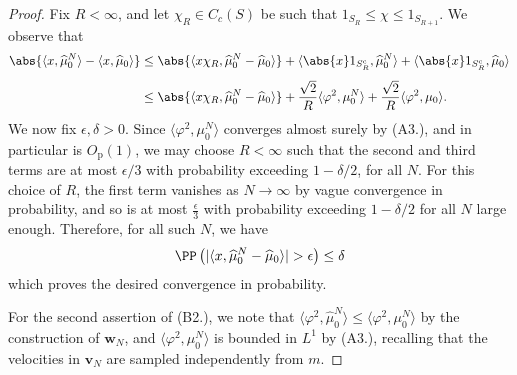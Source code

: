 \begin{proof}
Fix $R<\infty$, and let $\chi_R \in C_c(S)$ be such that $1_{S_R} \leq \chi \leq1_{S_{R+1}}$. We observe that
\begin{equation} \begin{split}
\abs{\langle x, \widehat{\mu}_0^N\rangle - \langle x, \widehat{\mu}_0\rangle}  &\leq
\abs{\langle x\chi_R, \widehat{\mu}_0^N-\widehat{\mu}_0\rangle } 
 +\langle \abs{x} 1_{S_R^\mathrm{c}},\widehat{\mu}_0^N\rangle
 +\langle \abs{x} 1_{S_R^\mathrm{c}},\widehat{\mu}_0\rangle \\[1ex]
 &\leq
 \abs{\langle x\chi_R, \widehat{\mu}_0^N-\widehat{\mu}_0\rangle} 
 +\frac{\sqrt{2}}{R}\langle \varphi^2,{\mu}_0^N\rangle
 +\frac{\sqrt{2}}{R}\langle \varphi^2,{\mu}_0\rangle.
\end{split} \end{equation}
We now fix $\epsilon, \delta>0$. Since $\langle \varphi^2,{\mu}_0^N\rangle$ converges almost surely by (A3.), and in particular is $O_\mathrm{p}(1)$, we may choose $R<\infty$ such that the second and third terms are at most $\epsilon/3$ with probability exceeding $1-\delta/2$, for all $N$. For this choice of $R$, the first term vanishes as $N\rightarrow\infty$ by vague convergence in probability, and so is at most $\frac{\epsilon}{3}$ with probability exceeding $1-\delta/2$ for all $N$ large enough. Therefore, for all such $N$, we have \begin{equation} \PP\left(|\langle x, \widehat{\mu}^N_0-\widehat{\mu}_0\rangle|>\epsilon\right)\le \delta \end{equation} which proves the desired convergence in probability.  

For the second assertion of (B2.), we note that $\langle \varphi^2, \widehat{\mu}^N_0\rangle \le \langle \varphi^2, \mu^N_0\rangle$ by the construction of $\mathbf{w}_N$, and $\langle \varphi^2, \mu^N_0\rangle$ is bounded in $L^1$ by (A3.), recalling that the velocities in $\mathbf{v}_N$ are sampled independently from $m$.
\end{proof}


